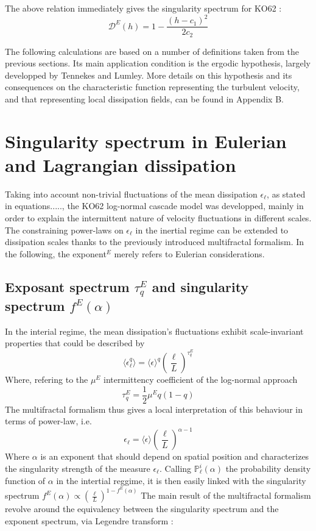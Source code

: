 The above relation immediately gives the singularity spectrum for KO62 :
\begin{equation}
    \mathcal{D}^E(h)=1-\frac{(h-c_1)^2}{2c_2}
\end{equation}

The following calculations are based on a number of definitions taken from the previous sections. Its main application condition is the ergodic hypothesis, largely developped by Tennekes and Lumley. More details on this hypothesis and its consequences on the characteristic function representing the turbulent velocity, and that representing local dissipation fields, can be found in Appendix B. 

\section{Singularity spectrum in Eulerian and Lagrangian dissipation}
Taking into account non-trivial fluctuations of the mean dissipation $\epsilon_\ell$, as stated in equations....., the KO62 log-normal cascade model was developped, mainly in order to explain the intermittent nature of velocity fluctuations in different scales.
The constraining power-laws on $\epsilon_\ell$ in the inertial regime can be extended to dissipation scales thanks to the previously introduced multifractal formalism. In the following, the exponent$^E$ merely refers to Eulerian considerations.

\subsection{Exposant spectrum $\tau_q^E$ and singularity spectrum $f^E(\alpha)$}
In the interial regime, the mean dissipation's fluctuations exhibit scale-invariant properties that could be described by
\begin{equation}
    \langle\epsilon_\ell^q\rangle=\langle\epsilon\rangle^q\left(\frac{\ell}{L}\right)^{\tau_q^E}
\end{equation}
Where, refering to the $\mu^E$ intermittency coefficient of the log-normal approach
\begin{equation}
    \tau_q^E=\frac{1}{2}\mu^Eq(1-q)
\end{equation}
The multifractal formalism thus gives a local interpretation of this behaviour in terms of power-law, i.e.
\begin{equation}
    \epsilon_\ell=\langle\epsilon\rangle\left(\frac{\ell}{L}\right)^{\alpha-1}
\end{equation}
Where $\alpha$ is an exponent that should depend on spatial position and characterizes the singularity strength of the measure $\epsilon_\ell$. Calling $\mathbb{P}_\ell^i(\alpha)$ the probability density function of $\alpha$ in the intertial reggime, it is then easily linked with the singularity spectrum $f^E(\alpha)\propto\left(\frac{\ell}{L}\right)^{1-f^E(\alpha)}$
The main result of the multifractal formalism revolve around the equivalency between the singularity spectrum and the exponent spectrum, via Legendre transform : 

